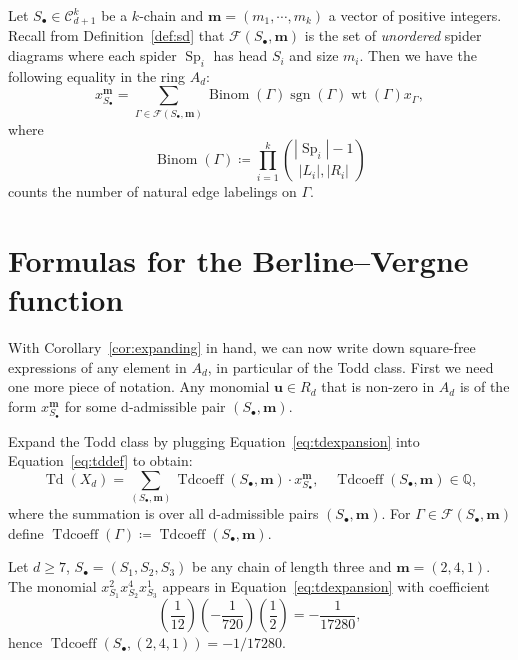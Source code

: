 \documentclass[ALCO,ThmDefs,Unicode,epreuves]{cedram}
\newcommand{\bm}[1]{{\boldsymbol{#1}}}
\newcommand\m{\bm{m}}
\renewcommand\u{\bm{u}}
\DeclareMathOperator{\wt}{wt}
\DeclareMathOperator{\Sp}{Sp}
\DeclareMathOperator{\Bi}{Binom}
\DeclareMathOperator{\sgn}{sgn}
\DeclareMathOperator{\Tdcoeff}{Tdcoeff}
\DeclareMathOperator{\td}{Td}
\newcommand{\D}{{\Gamma}}
\newcommand{\spd}{\mathcal F}
\newcommand{\CC}{\mathcal{C}}
\begin{document}
\begin{coro}\label{cor:expanding}
	Let $S_\bullet\in\CC_{d+1}^k$ be a $k$-chain and $\m= (m_1,\cdots,m_k)$ a vector of positive integers. Recall from Definition~\ref{def:sd} that $\spd(S_\bullet,\m)$ is the set of \emph{unordered} spider diagrams where each spider $\Sp_i$ has head $S_i$ and size $m_i$. Then we have the following equality in the ring $A_d$:
	\begin{equation}\label{eq:expansionsimpl}
	x_{S_\bullet}^\m = \sum_{\D\in\spd(S_\bullet,\m)}\Bi(\D)\sgn(\D)\wt(\D)x_\D,
	\end{equation}
	where
	\[\Bi(\D)\coloneqq \prod_{i=1}^k \binom{|\Sp_i|-1}{|L_i|,|R_i|}\]
	counts the number of natural edge labelings on $\D.$
\end{coro}

\section{Formulas for the Berline--Vergne function}\label{sec:bv}
With Corollary~\ref{cor:expanding} in hand, we can now write down square-free expressions of any element in $A_d$, in particular of the Todd class. First we need one more piece of notation. Any monomial $\u\in R_d$ that is non-zero in $A_d$ is of the form $x_{S_\bullet}^\m$ for some d-admissible pair $(S_\bullet,\m)$.
\begin{defi}
	Expand the Todd class by plugging Equation~\eqref{eq:tdexpansion} into Equation~\eqref{eq:tddef} to obtain:
	\begin{equation}\label{eq:masterbegin}
	\td(X_d) = \sum_{(S_\bullet,\m)}\Tdcoeff(S_\bullet,\m)\cdot x_{S_\bullet}^\m,\quad \Tdcoeff(S_\bullet,\m)\in\mathbb{Q},
	\end{equation}
	where the summation is over all d-admissible pairs $(S_\bullet,\m)$. For $\D\in\spd(S_\bullet,\m)$ define $\Tdcoeff(\D)\coloneqq \Tdcoeff(S_\bullet,\m)$.
	
\end{defi}
\begin{exam}
	Let $d\geq 7$, $S_\bullet=(S_1,S_2,S_3)$ be any chain of length three and $\m=(2,4,1)$. The monomial $x_{S_1}^2x_{S_2}^4x_{S_3}^1$ appears in Equation~\eqref{eq:tdexpansion} with coefficient
	\[
	\left(\frac{1}{12}\right)\left(-\frac{1}{720}\right)\left(\frac{1}{2}\right) = -\frac{1}{17280},
	\]
	hence $\Tdcoeff(S_\bullet,(2,4,1))=-1/17280$.
\end{exam}
\end{document}
